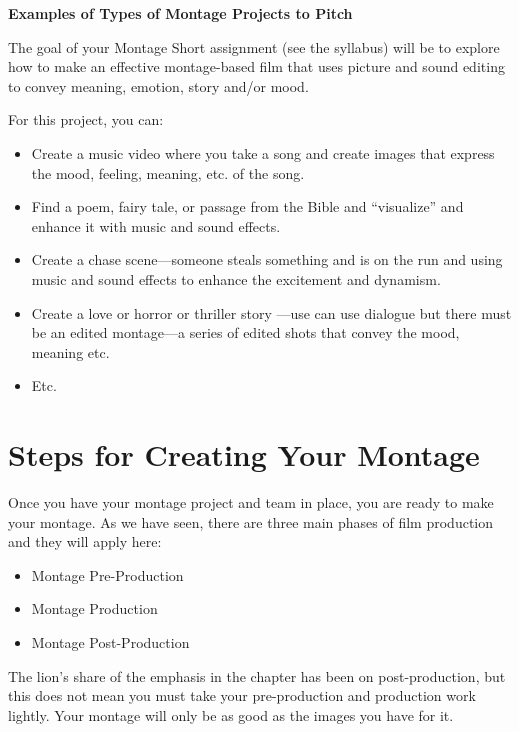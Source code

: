 \documentclass[
  letterpaper,
  DIV=11,
  numbers=noendperiod]{scrreprt}
\providecommand{\tightlist}{%
  \setlength{\itemsep}{0pt}\setlength{\parskip}{0pt}}\usepackage{longtable,booktabs,array}
\begin{document}
\begin{tcolorbox}
\textbf{Examples of Types of Montage Projects to Pitch}

The goal of your Montage Short assignment (see the syllabus) will be to
explore how to make an effective montage-based film that uses picture
and sound editing to convey meaning, emotion, story and/or mood.

For this project, you can:

\begin{itemize}
\tightlist
\item
  Create a music video where you take a song and create images that
  express the mood, feeling, meaning, etc. of the song.
\item
  Find a poem, fairy tale, or passage from the Bible and ``visualize''
  and enhance it with music and sound effects.
\item
  Create a chase scene---someone steals something and is on the run and
  using music and sound effects to enhance the excitement and dynamism.
\item
  Create a love or horror or thriller story ---use can use dialogue but
  there must be an edited montage---a series of edited shots that convey
  the mood, meaning etc.
\item
  Etc.
\end{itemize}

\end{tcolorbox}

\section{Steps for Creating Your
Montage}\label{steps-for-creating-your-montage}

Once you have your montage project and team in place, you are ready to
make your montage. As we have seen, there are three main phases of film
production and they will apply here:

\begin{itemize}
\tightlist
\item
  Montage Pre-Production
\item
  Montage Production
\item
  Montage Post-Production
\end{itemize}

The lion's share of the emphasis in the chapter has been on
post-production, but this does not mean you must take your
pre-production and production work lightly. Your montage will only be as
good as the images you have for it.
\end{document}
